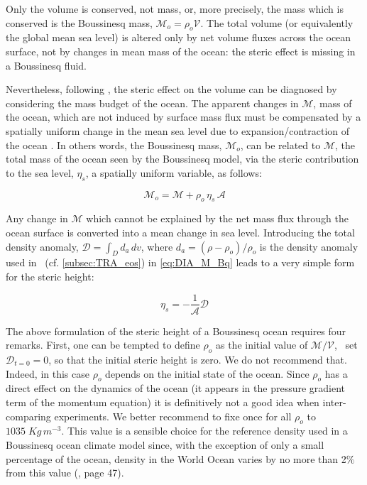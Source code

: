 \documentclass[../main/NEMO_manual]{subfiles}
\begin{document}
Only the volume is conserved, not mass, or, more precisely, the mass which is conserved is the Boussinesq mass,
$\mathcal{M}_o = \rho_o \mathcal{V}$.
The total volume (or equivalently the global mean sea level) is altered only by net volume fluxes across
the ocean surface, not by changes in mean mass of the ocean: the steric effect is missing in a Boussinesq fluid.

Nevertheless, following \citep{greatbatch_JGR94}, the steric effect on the volume can be diagnosed by
considering the mass budget of the ocean.
The apparent changes in $\mathcal{M}$, mass of the ocean, which are not induced by surface mass flux
must be compensated by a spatially uniform change in the mean sea level due to expansion/contraction of the ocean
\citep{greatbatch_JGR94}.
In others words, the Boussinesq mass, $\mathcal{M}_o$, can be related to $\mathcal{M}$,
the total mass of the ocean seen by the Boussinesq model, via the steric contribution to the sea level,
$\eta_s$, a spatially uniform variable, as follows:

\begin{equation}
  \mathcal{M}_o = \mathcal{M} + \rho_o \,\eta_s \,\mathcal{A}
  \label{eq:DIA_M_Bq}
\end{equation}

Any change in $\mathcal{M}$ which cannot be explained by the net mass flux through the ocean surface
is converted into a mean change in sea level.
Introducing the total density anomaly, $\mathcal{D}= \int_D d_a \,dv$,
where $d_a = (\rho -\rho_o ) / \rho_o$ is the density anomaly used in \NEMO\ (cf. \autoref{subsec:TRA_eos})
in \autoref{eq:DIA_M_Bq} leads to a very simple form for the steric height:

\begin{equation}
  \eta_s = - \frac{1}{\mathcal{A}} \mathcal{D}
  \label{eq:DIA_steric_Bq}
\end{equation}

The above formulation of the steric height of a Boussinesq ocean requires four remarks.
First, one can be tempted to define $\rho_o$ as the initial value of $\mathcal{M}/\mathcal{V}$,
\ie\ set $\mathcal{D}_{t=0}=0$, so that the initial steric height is zero.
We do not recommend that.
Indeed, in this case $\rho_o$ depends on the initial state of the ocean.
Since $\rho_o$ has a direct effect on the dynamics of the ocean
(it appears in the pressure gradient term of the momentum equation)
it is definitively not a good idea when inter-comparing experiments.
We better recommend to fixe once for all $\rho_o$ to $1035\;Kg\,m^{-3}$.
This value is a sensible choice for the reference density used in a Boussinesq ocean climate model since,
with the exception of only a small percentage of the ocean, density in the World Ocean varies by no more than
2$\%$ from this value (\cite{gill_bk82}, page 47).
\end{document}
